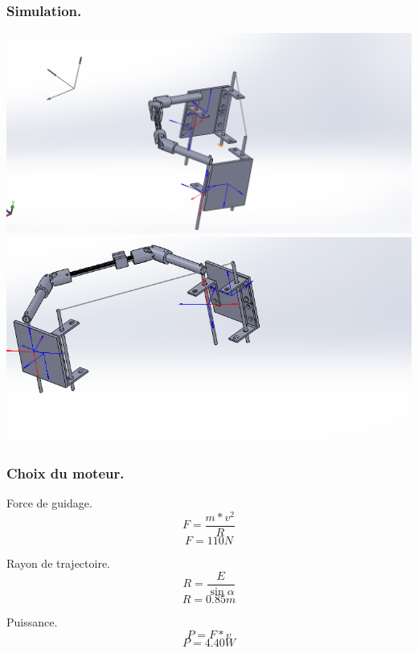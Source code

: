 \begin{frame}
    \frametitle{Simulation.}
    \begin{center}
         {
            \includegraphics[width=\linewidth]{rcs/solid1.png}
        }  {
            \includegraphics[width=\linewidth]{rcs/solid2.png}
        }
    \end{center}
\end{frame}

\begin{frame}
    \frametitle{Choix du moteur.}
    \begin{block}{Force de guidage.}
        \[ F = \frac{m*v^2}{R} \]
        \[ F = 110 N \]
    \end{block}
     {
        \begin{block}{Rayon de trajectoire.}
            \[ R = \frac{E}{\sin \alpha} \]
            \[ R = 0.85m \]
        \end{block}
    }
     {
        \begin{block}{Puissance.}
            \[ P = F * v \]
            \[ P = 4.40W \]
        \end{block}
    }
\end{frame}


